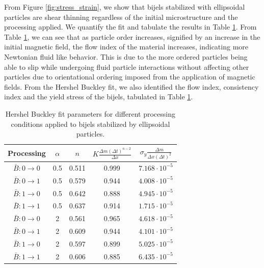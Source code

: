 From Figure \ref{fig:stress_strain}, we show that bijels stabilized with ellipsoidal particles are shear thinning regardless of the initial 
microstructure and the processing applied. We quantify the fit and tabulate the results in Table \ref{table:rheology_fit}. From Table 
\ref{table:rheology_fit}, we can see that as particle order increases, signified by an increase in the initial magnetic field, the flow index 
of the material increases, indicating more Newtonian fluid like behavior. This is due to the more ordered particles being able to slip
while undergoing fluid particle interactions without affecting other particles due to orientational ordering imposed from the application 
of magnetic fields. From the Hershel Buckley fit, we also identified the flow index, consistency index and the yield stress of the bijels,
tabulated in Table \ref{table:rheology_fit}.

\begin{table}[h!]
    \centering
    \begin{tabular}{||c c c c c||} 
     \hline
     Processing & $\alpha$ & $n$ & $K \frac{\Delta m (\Delta t)^{n-2}}{\Delta x} $ & $\sigma_{y} \frac{\Delta m}{\Delta x (\Delta t)^2}$ \\ [0.5ex] 
     \hline\hline
     $\bar{B}: 0 \rightarrow 0$ & 0.5 & 0.511 & 0.999 & $7.168 \cdot 10^{-5}$ \\ 
     \hline
     $\bar{B}: 0 \rightarrow 1$ & 0.5 & 0.579 & 0.944 & $4.008 \cdot 10^{-5}$ \\
     \hline
     $\bar{B}: 1 \rightarrow 0$ & 0.5 & 0.642 & 0.888 & $4.945 \cdot 10^{-5}$ \\
     \hline
     $\bar{B}: 1 \rightarrow 1$ & 0.5 & 0.637 & 0.914 & $1.715 \cdot 10^{-5}$ \\
     \hline
     $\bar{B}: 0 \rightarrow 0$ & 2 & 0.561 & 0.965 & $4.618 \cdot 10^{-5}$ \\
     \hline
     $\bar{B}: 0 \rightarrow 1$ & 2 & 0.609 & 0.944 & $4.101 \cdot 10^{-5}$ \\
     \hline
     $\bar{B}: 1 \rightarrow 0$ & 2 & 0.597 & 0.899 & $5.025 \cdot 10^{-5}$ \\
     \hline
     $\bar{B}: 1 \rightarrow 1$ & 2 & 0.606 & 0.885 & $6.435 \cdot 10^{-5}$ \\ [1ex] 
     \hline
    \end{tabular}
    \caption{Hershel Buckley fit parameters for different processing conditions applied to bijels stabilized by ellipsoidal particles.}
    \label{table:rheology_fit}
\end{table}
 
